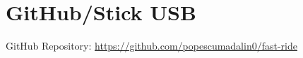 \documentclass[a4paper,12pt]{report}
\begin{document}


\setcounter{page}{1}
\pagestyle{fancy}

\fancyhf{}
\fancyhead[R]{\nouppercase{\leftmark}}
\renewcommand{\headrulewidth}{0pt}
\fancyfoot[C]{\thepage}

\renewcommand{\chaptermark}[1]{\markboth{#1}{}}

\tableofcontents
\clearpage

\listoffigures

\newpage


\newpage


\newpage


\newpage


\newpage


\newpage


\printbibliography

\newpage
\chapter*{GitHub/Stick USB}
GitHub Repository: \url{https://github.com/popescumadalin0/fast-ride}
\end{document}
